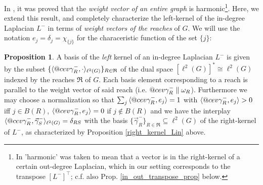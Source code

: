 \documentclass[reqno,12pt,letterpaper]{amsart}
\makeatletter
\numberwithin{equation}{section}
\newcommand{\Lin}{L^{-}}
\DeclareRobustCommand{\cev}[1]{%
	\mathpalette\do@cev{#1}%
}
\newcommand{\do@cev}[2]{%
	\fix@cev{#1}{+}%
	\reflectbox{$\m@th#1\vec{\reflectbox{$\fix@cev{#1}{-}\m@th#1#2\fix@cev{#1}{+}$}}$}%
	\fix@cev{#1}{-}%
}
\newcommand{\fix@cev}[2]{%
	\ifx#1\displaystyle
	\mkern#23mu
	\else
	\ifx#1\textstyle
	\mkern#23mu
	\else
	\ifx#1\scriptstyle
	\mkern#22mu
	\else
	\mkern#22mu
	\fi
	\fi
	\fi
}
\newcommand{\1}{\mathds{1}}
\theoremstyle{definition}
\newtheorem{Prop}[Th]{Proposition}
\makeatother
\begin{document}
In \cite[Theorem 1]{sahi2014harmonic}, it was proved that the \emph{weight vector of an entire graph} is harmonic\footnote{In \cite{sahi2014harmonic} 'harmonic' was taken to mean that a vector is in the right-kernel of a certain out-degree Laplacian, which in our setting corresponds to the transpose $[\Lin]^\intercal$; c.f. also  Prop. \ref{in_out_transpose_prop} below.}. Here, we extend this result, and completely characterize the left-kernel of the in-degree Laplacian $\Lin$ in terms of \emph{weight vectors of the reaches} of $G$. We will use the notation  $e_j = \delta_{j} = \chi_{\{j\}}$ for the characeristic function of the set $\{j\}$:
	
	
\begin{Prop}\label{prop:leftkernel_-}
	A basis of the \emph{left} kernel of an in-degree Laplacian $\Lin$ is 
	given by the subset
	$\{\langle \cev\gamma^{-}_{R},\cdot \rangle_{\ell^2(G)}\}_{R \in \mathfrak{R}}$ of the dual space $[\ell^2(G)]^* \cong \ell^2(G)$ indexed by the reaches $\mathfrak{R}$ of $G$. Each basis element corresponding to a reach is parallel to the weight vector of said reach (i.e. $\cev \gamma^{-}_{R} \parallel \omega_R$). Furthermore we may choose a normalization so that  $\sum_{j}\, \langle \cev \gamma^{-}_{R}, e_j \rangle =1 $ with  $	\langle \cev \gamma^{-}_{R}, e_j \rangle >0 $ iff $j \in B(R)$,  $	\langle \cev \gamma^{-}_{R}, e_j \rangle  = 0 $ if $j \notin B(R)$ 
	and we have 
	the  interplay $
	\langle \cev\gamma^{-}_{R}, \vec\gamma^{-}_{S}\rangle_{\ell^2(G)} = \delta_{RS}$ with the basis $\{\vec \gamma^{-}_{R}\}_{R \in \mathfrak{R}} \subseteq  \ell^2(G)$ of the right-kernel of $\Lin$, as characterized by Proposition \ref{right_kernel_Lin} above.
\end{Prop}
\end{document}
